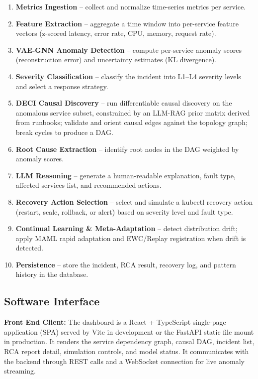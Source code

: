 \documentclass[11pt,a4paper]{article}
\begin{document}
\begin{enumerate}
    \item \textbf{Metrics Ingestion} -- collect and normalize time-series metrics per service.
    \item \textbf{Feature Extraction} -- aggregate a time window into per-service feature vectors (z-scored latency, error rate, CPU, memory, request rate).
    \item \textbf{VAE-GNN Anomaly Detection} -- compute per-service anomaly scores (reconstruction error) and uncertainty estimates (KL divergence).
    \item \textbf{Severity Classification} -- classify the incident into L1--L4 severity levels and select a response strategy.
    \item \textbf{DECI Causal Discovery} -- run differentiable causal discovery on the anomalous service subset, constrained by an LLM-RAG prior matrix derived from runbooks; validate and orient causal edges against the topology graph; break cycles to produce a DAG.
    \item \textbf{Root Cause Extraction} -- identify root nodes in the DAG weighted by anomaly scores.
    \item \textbf{LLM Reasoning} -- generate a human-readable explanation, fault type, affected services list, and recommended actions.
    \item \textbf{Recovery Action Selection} -- select and simulate a kubectl recovery action (restart, scale, rollback, or alert) based on severity level and fault type.
    \item \textbf{Continual Learning \& Meta-Adaptation} -- detect distribution drift; apply MAML rapid adaptation and EWC/Replay registration when drift is detected.
    \item \textbf{Persistence} -- store the incident, RCA result, recovery log, and pattern history in the database.
\end{enumerate}


\subsection{Software Interface}

\textbf{Front End Client:}
The dashboard is a React + TypeScript single-page application (SPA) served by Vite in development or the FastAPI static file mount in production. It renders the service dependency graph, causal DAG, incident list, RCA report detail, simulation controls, and model status. It communicates with the backend through REST calls and a WebSocket connection for live anomaly streaming.
\end{document}
